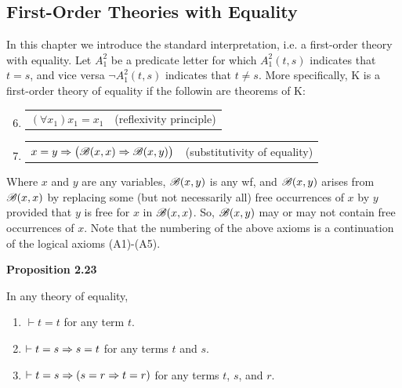 \subsection{First-Order Theories with Equality}

In this chapter we introduce the standard interpretation, i.e. a first-order theory with equality. Let $A_1^2$ be a predicate letter for which $A_1^2(t,s)$ indicates that $t=s$, and vice versa $\lnot A_1^2(t, s)$ indicates that $t \not = s$. More specifically, K is a first-order theory of equality if the followin are theorems of K:

\begin{enumerate} [label = (A\arabic*)]
    \setcounter{enumi}{5}
    \item
        \begin{tabular}{p{8cm} r}
            $(\forall x_1)x_1=x_1$ & (reflexivity principle)
        \end{tabular}
    \item
        \begin{tabular}{p{8cm} r}
            $x=y \Rightarrow \big(\mathscr{B}(x,x) \Rightarrow \mathscr{B}(x,y) \big)$ & (substitutivity of equality)
        \end{tabular}
\end{enumerate}
Where $x$ and $y$ are any variables, $\mathscr{B}(x,y)$ is any wf, and $\mathscr{B}(x,y)$ arises from $\mathscr{B}(x,x)$ by replacing some (but not necessarily all) free occurrences of $x$ by $y$ provided that $y$ is free for $x$ in $\mathscr{B}(x,x)$. So, $\mathscr{B}(x,y)$ may or may not contain free occurrences of $x$. Note that the numbering of the above axioms is a continuation of the logical axioms (A1)-(A5).

\textbf{Proposition 2.23}

In any theory of equality,
\begin{enumerate}
    \item $\vdash t=t$ for any term $t$.
    \item $\vdash t=s \Rightarrow s=t$ for any terms $t$ and $s$.
    \item $\vdash t=s \Rightarrow (s=r \Rightarrow t=r)$ for any terms $t$, $s$, and $r$.
\end{enumerate}

